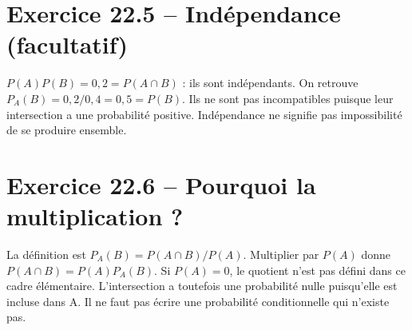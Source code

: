\section*{Exercice 22.5 -- Indépendance (facultatif)}
$P(A)P(B)=0{,}2=P(A\cap B)$ : ils sont indépendants. On retrouve $P_A(B)=0{,}2/0{,}4=0{,}5=P(B)$. Ils ne sont pas incompatibles puisque leur intersection a une probabilité positive. Indépendance ne signifie pas impossibilité de se produire ensemble.

\section*{Exercice 22.6 -- Pourquoi la multiplication ?}
La définition est $P_A(B)=P(A\cap B)/P(A)$. Multiplier par $P(A)$ donne $P(A\cap B)=P(A)P_A(B)$. Si $P(A)=0$, le quotient n'est pas défini dans ce cadre élémentaire. L'intersection a toutefois une probabilité nulle puisqu'elle est incluse dans A. Il ne faut pas écrire une probabilité conditionnelle qui n'existe pas.
